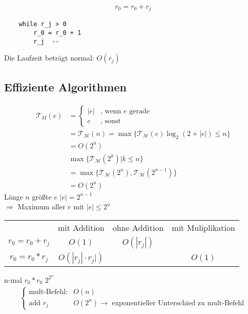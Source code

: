 \begin{align*}
    r_0 = r_0 + r_j
\end{align*}

\begin{verbatim}
    while r_j > 0
        r_0 = r_0 + 1
        r_j  --
\end{verbatim}

Die Laufzeit beträgt normal: $O(r_j)$

\subsection{Effiziente Algorithmen}

\newcommand{\tcal}{\mathcal{T}_{\mathcal{M}}}
\begin{align*}
    \mathcal{T}_M(e) &= \begin{cases}
    |e| & \text{, wenn } e \text{ gerade}\\
    c & \text{, sonst}
    \end{cases}\\
    &= \tcal(n) = \max\{\tcal (e) \log_2(2 + |e|) \leq n\}\\
    &= O(2^n)\\
    &\max \{\tcal(2^k)| k \leq n\}\\
    &= \max \{\tcal(2^n), \tcal(2^{n-1})\}\\
    &= O(2^n)
\end{align*}
Länge $n$ größte $e$ $|e|= 2^{n-1}$\\
$\Rightarrow$ Maximum aller $e$ mit $|e| \leq 2^n$\\

\begin{tabular}{cccc}
    &mit Addition & ohne Addition & mit Muliplikation\\
    $r_0 = r_0 + r_j$&$O(1)$ & $O(|r_j|)$\\
    $r_0 = r_0 * r_j$&$O(|r_j| \cdot r_j|)$ & & $O(1)$ 
\end{tabular}

n-mal $r_0 * r_0$ $2^{2^n}$
\begin{align*}
\begin{cases}
\text{mult-Befehl:} & O(n)\\
\text{add } r_j & O(2^n) \rightarrow\text{ exponentieller Unterschied zu mult-Befehl}
\end{cases}
\end{align*}
